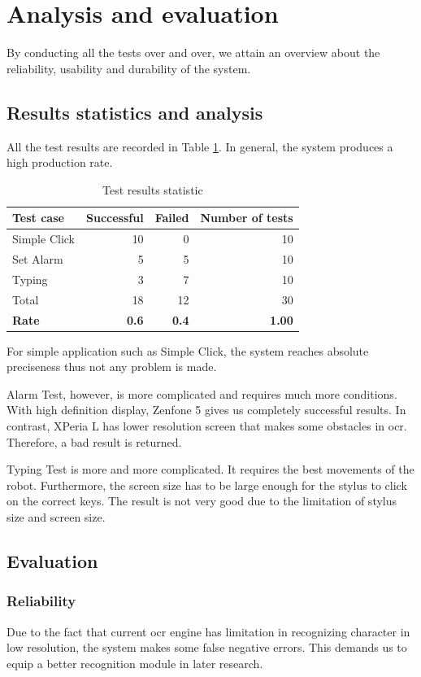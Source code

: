 \section{Analysis and evaluation}
By conducting all the tests over and over, we attain an overview about the reliability, usability and durability of the system.

\subsection{Results statistics and analysis}
All the test results are recorded in Table \ref{tab:result_stat}. In general, the system produces a high production rate.

	\begin{table}[H]
		\centering
		\caption{Test results statistic}	
		\label{tab:result_stat}
		\begin{tabular}{|l|rrr|}
			\hline
			Test case & Successful & Failed & Number of tests \\
			\hline
			Simple Click & 10 & 0 & 10 \\
			Set Alarm & 5 & 5 & 10 \\
			Typing & 3 & 7 & 10 \\
			\hline
			Total & 18 & 12 & 30 \\
			\hline
			\textbf{Rate} & \textbf{0.6} & \textbf{0.4} & \textbf{1.00} \\
			\hline
		\end{tabular}
	\end{table}

For simple application such as Simple Click, the system reaches absolute preciseness thus not any problem is made.

Alarm Test, however, is more complicated and requires much more conditions. With high definition display, Zenfone 5 gives us completely successful results. In contrast, XPeria L has lower resolution screen that makes some obstacles in \acrshort{ocr}. Therefore, a bad result is returned.

Typing Test is more and more complicated. It requires the best movements of the robot. Furthermore, the screen size has to be large enough for the stylus to click on the correct keys. The result is not very good due to the limitation of stylus size and screen size.

\subsection{Evaluation}
\subsubsection{Reliability}
Due to the fact that current \acrshort{ocr} engine has limitation in recognizing character in low resolution, the system makes some false negative errors. This demands us to equip a better recognition module in later research.

